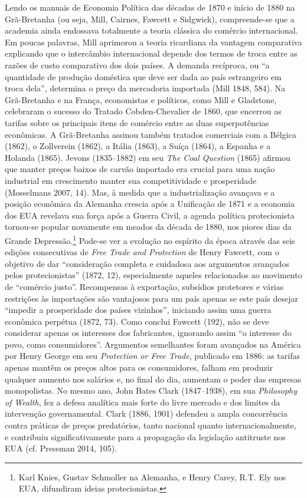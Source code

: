 \documentclass[12pt]{article}
\begin{document}
Lendo os manuais de Economia Política das décadas de 1870 e início de 1880 na Grã-Bretanha (ou seja, Mill, Cairnes, Fawcett e Sidgwick), compreende-se que a academia ainda endossava totalmente a teoria clássica do comércio internacional. Em poucas palavras, Mill aprimorou a teoria ricardiana da vantagem comparativa explicando que o intercâmbio internacional depende dos termos de troca entre as razões de custo comparativo dos dois países. A demanda recíproca, ou “a quantidade de produção doméstica que deve ser dada ao país estrangeiro em troca dela”, determina o preço da mercadoria importada (Mill 1848, 584). Na Grã-Bretanha e na França, economistas e políticos, como Mill e Gladstone, celebraram o sucesso do Tratado Cobden-Chevalier de 1860, que encerrou as tarifas sobre os principais itens de comércio entre as duas superpotências econômicas. A Grã-Bretanha assinou também tratados comerciais com a Bélgica (1862), o Zollverein (1862), a Itália (1863), a Suíça (1864), a Espanha e a Holanda (1865). Jevons (1835–1882) em seu \textit{The Coal Question} (1865) afirmou que manter preços baixos de carvão importado era crucial para uma nação industrial em crescimento manter sua competitividade e prosperidade (Mosselmans 2007, 14). Mas, à medida que a industrialização avançava e a posição econômica da Alemanha crescia após a Unificação de 1871 e a economia dos EUA revelava sua força após a Guerra Civil, a agenda política protecionista tornou-se popular novamente em meados da década de 1880, nos piores dias da Grande Depressão.\footnote{Karl Knies, Gustav Schmoller na Alemanha, e Henry Carey, R.T. Ely nos EUA, difundiram ideias protecionistas.} Pode-se ver a evolução no espírito da época através das seis edições consecutivas de \textit{Free Trade and Protection} de Henry Fawcett, com o objetivo de dar “consideração completa e cuidadosa aos argumentos avançados pelos protecionistas” (1872, 12), especialmente aqueles relacionados ao movimento de “comércio justo”. Recompensas à exportação, subsídios protetores e várias restrições às importações são vantajosos para um país apenas se este país desejar “impedir a prosperidade dos países vizinhos”, iniciando assim uma guerra econômica perpétua (1872, 73). Como conclui Fawcett (192), não se deve considerar apenas os interesses dos fabricantes, ignorando assim “o interesse do povo, como consumidores”. Argumentos semelhantes foram avançados na América por Henry George em seu \textit{Protection or Free Trade}, publicado em 1886: as tarifas apenas mantêm os preços altos para os consumidores, falham em produzir qualquer aumento nos salários e, no final do dia, aumentam o poder das empresas monopolistas. No mesmo ano, John Bates Clark (1847–1938), em sua \textit{Philosophy of Wealth}, fez a defesa analítica mais forte do livre mercado e dos limites da intervenção governamental. Clark (1886, 1901) defendeu a ampla concorrência contra práticas de preços predatórios, tanto nacional quanto internacionalmente, e contribuiu significativamente para a propagação da legislação antitruste nos EUA (cf. Pressman 2014, 105).
\end{document}

